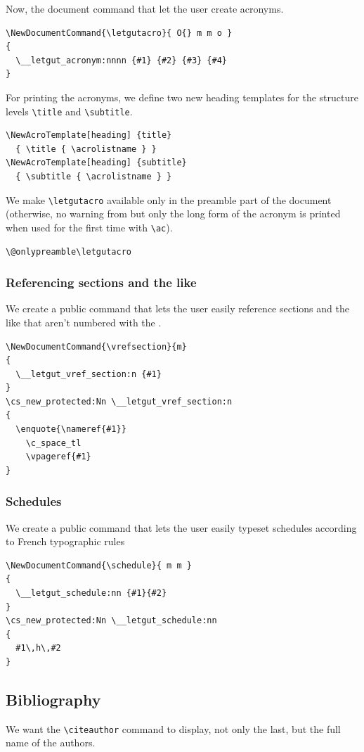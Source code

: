 \documentclass{letgut}
\begin{document}
Now, the document command that let the user create acronyms.
\begin{lstlisting}
\NewDocumentCommand{\letgutacro}{ O{} m m o }
{
  \__letgut_acronym:nnnn {#1} {#2} {#3} {#4}
}
\end{lstlisting}
For printing the acronyms, we define two new heading templates for the structure
levels \lstinline+\title+ and \lstinline+\subtitle+.
\begin{lstlisting}
\NewAcroTemplate[heading] {title}
  { \title { \acrolistname } }
\NewAcroTemplate[heading] {subtitle}
  { \subtitle { \acrolistname } }
\end{lstlisting}
We make \lstinline+\letgutacro+ available only in the preamble part of the document
(otherwise, no warning from  but only the long form of the acronym
is printed when used for the first time with \lstinline+\ac+).
\begin{lstlisting}
\@onlypreamble\letgutacro
\end{lstlisting}
\subsubsection{Referencing sections and the like}
\label{ImplementationDocumentcommandsReferencingsectionsandthelike-u3u8frr0dpk0}
We create a public command that lets the user easily reference sections and the
like that aren't numbered with the .

\begin{lstlisting}
\NewDocumentCommand{\vrefsection}{m}
{
  \__letgut_vref_section:n {#1}
}
\cs_new_protected:Nn \__letgut_vref_section:n
{
  \enquote{\nameref{#1}}
    \c_space_tl
    \vpageref{#1}
}
\end{lstlisting}
\subsubsection{Schedules}
\label{ImplementationDocumentcommandsTime-z7e17ns00uk0}
We create a public command that lets the user easily typeset schedules according to
French typographic rules

\begin{lstlisting}
\NewDocumentCommand{\schedule}{ m m }
{
  \__letgut_schedule:nn {#1}{#2}
}
\cs_new_protected:Nn \__letgut_schedule:nn
{
  #1\,h\,#2
}
\end{lstlisting}
\subsection{Bibliography}
\label{ImplementationBibliography-ruyg55h0jlj0}
We want the \lstinline+\citeauthor+ command to display, not only the last, but the
full name of the authors.
\end{document}
